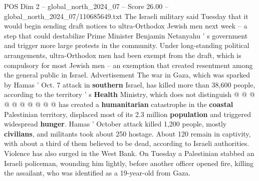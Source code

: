 \begin{textsample}{POS Dim 2 – global\_north\_2024\_07 – Score 26.00 – global\_north\_2024\_07/110685649.txt}
The Israeli military said Tuesday that it would begin sending draft notices to ultra-Orthodox Jewish men next week -- a step that could destabilize Prime Minister Benjamin Netanyahu ' s government and trigger more large protests in the community.
Under long-standing political arrangements, ultra-Orthodox men had been exempt from the draft, which is compulsory for most Jewish men -- an exemption that created resentment among the general public in Israel.
Advertisement The war in Gaza, which was sparked by Hamas ' Oct. 7 attack in \textbf{southern} Israel, has killed more than 38,600 people, according to the territory ' s \textbf{Health} Ministry, which does not distinguish @ @ @ @ @ @ @ @ @ @ has created a \textbf{humanitarian} catastrophe in the \textbf{coastal} Palestinian territory, displaced most of its 2.3 million \textbf{population} and triggered widespread \textbf{hunger}.
Hamas ' October attack killed 1,200 people, mostly \textbf{civilians}, and militants took about 250 hostage.
About 120 remain in captivity, with about a third of them believed to be dead, according to Israeli authorities.
Violence has also surged in the West Bank.
On Tuesday a Palestinian stabbed an Israeli policeman, wounding him lightly, before another officer opened fire, killing the assailant, who was identified as a 19-year-old from Gaza.

\end{textsample}
